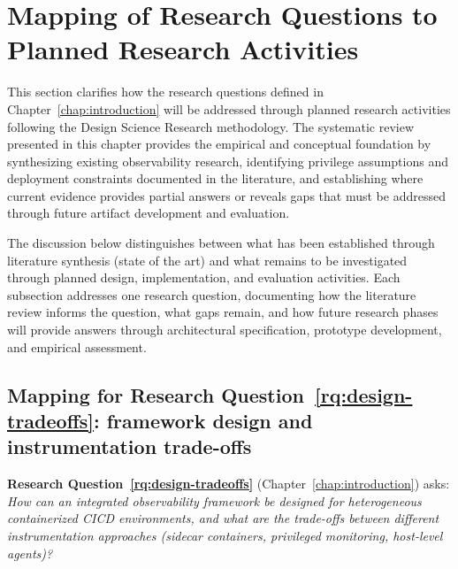
\section{Mapping of Research Questions to Planned Research Activities}
\label{sec:rq-mapping}

This section clarifies how the research questions defined in Chapter~\ref{chap:introduction} will be addressed through planned research activities following the Design Science Research methodology. The systematic review presented in this chapter provides the empirical and conceptual foundation by synthesizing existing observability research, identifying privilege assumptions and deployment constraints documented in the literature, and establishing where current evidence provides partial answers or reveals gaps that must be addressed through future artifact development and evaluation.

The discussion below distinguishes between what has been established through literature synthesis (state of the art) and what remains to be investigated through planned design, implementation, and evaluation activities. Each subsection addresses one research question, documenting how the literature review informs the question, what gaps remain, and how future research phases will provide answers through architectural specification, prototype development, and empirical assessment.

\subsection{\texorpdfstring{Mapping for Research Question~\ref{rq:design-tradeoffs}: framework design and instrumentation trade-offs}{Mapping for Research Question 1: framework design and instrumentation trade-offs}}
\label{sec:rq1-mapping}

\textbf{Research Question~\ref{rq:design-tradeoffs}} (Chapter~\ref{chap:introduction}) asks: \textit{How can an integrated observability framework be designed for heterogeneous containerized \ac{CICD} environments, and what are the trade-offs between different instrumentation approaches (sidecar containers, privileged monitoring, host-level agents)?}

